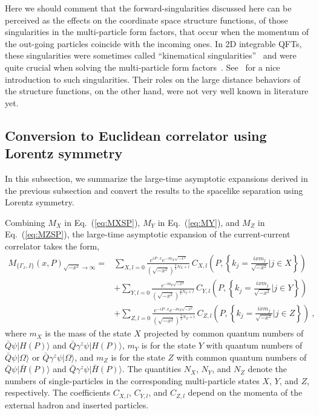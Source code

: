 \documentclass[a4paper,11pt]{article}
\begin{document}
Here we should comment that the forward-singularities discussed here can be perceived as the effects on the coordinate space structure functions, of those singularities in the multi-particle form factors, that occur when the momentum of the out-going particles coincide with the incoming ones. In 2D integrable QFTs, these singularities were sometimes called ``kinematical singularities''~\cite{Bajnok:2006ze} and were quite crucial when solving the multi-particle form factors~\cite{Karowski:1978vz,Berg:1978sw,Kirillov:1988zk,Smirnov:1992vz,Balog:1994np,Babujian:2013roa}. See~\cite{Babujian:1998uw} for a nice introduction to such singularities. Their roles on the large distance behaviors of the structure functions, on the other hand, were not very well known in literature yet.


\subsection{Conversion to Euclidean correlator using Lorentz symmetry}\label{sec:Lorentz}
In this subsection, we summarize the large-time asymptotic expansions derived in the previous subsection and convert the results to the spacelike separation using Lorentz symmetry. 

Combining $M_X$ in Eq.~(\ref{eq:MXSP}), $M_Y$ in Eq.~(\ref{eq:MY}), and $M_Z$ in Eq.~(\ref{eq:MZSP}), the large-time asymptotic expansion of the current-current correlator takes the form,
\begin{align}\label{eq:Mexp}
M_{\{\Gamma_x,I\}}(x,P)_{\sqrt{-x^2} \rightarrow \infty}
=&  \sum_{X,l=0} \frac{e^{i P \cdot x} e^{-m_X\sqrt{-x^2}}}{\left(\sqrt{-x^2}\right)^{\frac{3}{2}N_X+l}} \, C_{X,l}\left(P, \left\{k_j = \frac{i x m_j}{\sqrt{-x^2}} \bigg| j\in X\right\}\right) \nonumber\\
& + \sum_{Y,l=0} \frac{e^{-m_Y\sqrt{-x^2}}}{\left(\sqrt{-x^2}\right)^{\frac{3}{2}N_Y+l}} \, C_{Y,l}\left(P, \left\{k_j = \frac{i x m_j}{\sqrt{-x^2}} \bigg| j\in Y\right\}\right) \nonumber\\
& + \sum_{Z,l=0} \frac{e^{-i P \cdot x} e^{-m_Z\sqrt{-x^2}}}{\left(\sqrt{-x^2}\right)^{\frac{3}{2}N_Z+l}} \, C_{Z,l}\left(P, \left\{k_j = \frac{i x m_j}{\sqrt{-x^2}} \bigg| j\in Z\right\}\right) \ ,
\end{align}
where $m_X$ is the mass of the state $X$ projected by common quantum numbers of $\bar{Q} \psi | H(P) \rangle$ and $\bar{Q} \gamma^z \psi | H(P) \rangle$, $m_Y$ is for the state $Y$ with quantum numbers of $\bar{Q}  \psi | \Omega \rangle$ or $\bar{Q} \gamma^z \psi | \Omega \rangle$, and $m_Z$ is for the state $Z$ with common quantum numbers of $\bar{Q} \psi | \bar{H}(P) \rangle$ and $\bar{Q} \gamma^z \psi | \bar{H}(P) \rangle$. The quantities $N_X$, $N_Y$, and $N_Z$ denote the numbers of single-particles in the corresponding multi-particle states $X$, $Y$, and $Z$, respectively. The coefficients $C_{X,l}$, $C_{Y,l}$, and $C_{Z,l}$ depend on the momenta of the external hadron and inserted particles. 
\end{document}
